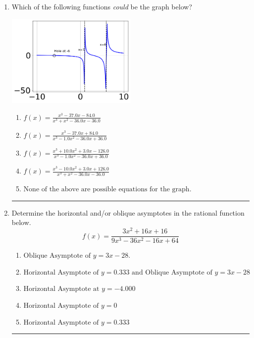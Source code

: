 \documentclass[14pt]{extbook}
\newcommand{\litem}[1]{\item#1\hspace*{-1cm}\rule{\textwidth}{0.4pt}}
\begin{document}
\begin{enumerate}
{\begin{enumerate}[label=\Alph*.]
\end{enumerate} }
\litem{
Which of the following functions \textit{could} be the graph below?
\begin{center}
    \includegraphics[width=0.5\textwidth]{../Figures/identifyGraphOfRationalFunctionCopyA.png}
\end{center}
\begin{enumerate}[label=\Alph*.]
\item \( f(x)=\frac{x^{3} -37.0 x -84.0}{x^{3} + x^{2} -36.0 x -36.0} \)
\item \( f(x)=\frac{x^{3} -37.0 x + 84.0}{x^{3} -1.0 x^{2} -36.0 x + 36.0} \)
\item \( f(x)=\frac{x^{3} +10.0 x^{2} +3.0 x -126.0}{x^{3} -1.0 x^{2} -36.0 x + 36.0} \)
\item \( f(x)=\frac{x^{3} -10.0 x^{2} +3.0 x + 126.0}{x^{3} + x^{2} -36.0 x -36.0} \)
\item \( \text{None of the above are possible equations for the graph.} \)

\end{enumerate} }
\litem{
Determine the horizontal and/or oblique asymptotes in the rational function below.\[ f(x) = \frac{3x^{2} +16 x + 16}{9x^{3} -36 x^{2} -16 x + 64} \]\begin{enumerate}[label=\Alph*.]
\item \( \text{Oblique Asymptote of } y = 3x -28. \)
\item \( \text{Horizontal Asymptote of } y = 0.333 \text{ and Oblique Asymptote of } y = 3x -28 \)
\item \( \text{Horizontal Asymptote at } y = -4.000 \)
\item \( \text{Horizontal Asymptote of } y = 0 \)
\item \( \text{Horizontal Asymptote of } y = 0.333  \)


\end{enumerate}}
\end{enumerate}
\end{document}
